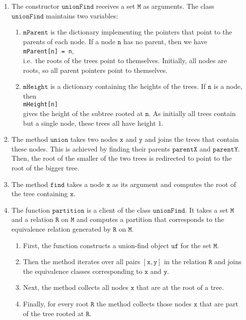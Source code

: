 \begin{enumerate}
\item The constructor $\texttt{unionFind}$ receives a set $\texttt{M}$ as arguments.  The class
      $\texttt{unionFind}$ maintains two variables:
      \begin{enumerate}
      \item $\texttt{mParent}$ is the dictionary implementing the pointers that point to the parents
             of each node.  If a node $\texttt{n}$ has no parent, then we have
             \\[0.2cm]
             \hspace*{1.3cm}
             \texttt{mParent[n] = n},
             \\[0.2cm]
             i.e.~the roots of the trees point to themselves.  Initially, all nodes are roots, so
             all parent pointers point to themselves.
      \item $\texttt{mHeight}$ is a dictionary containing the heights of the trees.  If $\texttt{n}$ is
            a node, then
            \\[0.2cm]
            \hspace*{1.3cm}
            \texttt{mHeight[n]}
            \\[0.2cm]
            gives the height of the subtree rooted at $\texttt{n}$. As initially all trees contain but
            a single node, these trees all have height $1$.
      \end{enumerate}
\item The method $\texttt{union}$ takes two nodes $\texttt{x}$ and $\texttt{y}$ and joins the trees that
      contain these nodes.  This is achieved by finding their parents $\texttt{parentX}$ and
      $\texttt{parentY}$.  Then, the root of the smaller of the two trees is redirected to point to
      the root of the bigger tree.
\item The method $\texttt{find}$ takes a node $\texttt{x}$ as its argument and computes the root of the
      tree containing $\texttt{x}$. 
\item The function $\texttt{partition}$ is a client of the class $\texttt{unionFind}$.  It takes a set
      $\texttt{M}$ and a relation $\texttt{R}$ on $\texttt{M}$ and computes a partition that corresponds
      to the equivalence relation generated by $\texttt{R}$ on $\texttt{M}$. 
      \begin{enumerate}
      \item First, the function constructs a union-find object $\texttt{uf}$ for the set $\texttt{M}$.
      \item Then the method iterates over all pairs $[\texttt{x},\texttt{y}]$ in the relation $\texttt{R}$ and
            joins the equivalence classes corresponding to $\texttt{x}$ and $\texttt{y}$.
      \item Next, the method collects all nodes $\texttt{x}$ that are at the root of a tree.
      \item Finally, for every root $\texttt{R}$ the method collects those nodes $\texttt{x}$ that are
            part of the tree rooted at $\texttt{R}$.
      \end{enumerate}
\end{enumerate}


